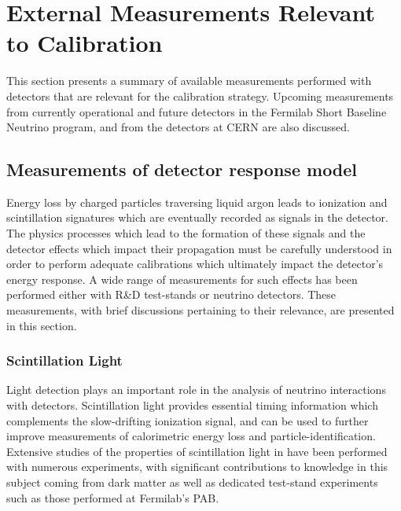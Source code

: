 \section{External Measurements Relevant to Calibration }\label{sec:extcalib}
This section presents a summary of available measurements performed with  detectors that are relevant for the  calibration strategy. Upcoming measurements from currently operational and future detectors in the Fermilab Short Baseline Neutrino program, and from the  detectors %
at CERN are also discussed. 

\subsection{Measurements of detector response model}
Energy loss by charged particles traversing liquid argon leads to ionization and scintillation signatures which are eventually recorded as signals in the detector. The physics processes which lead to the formation of these signals and the detector effects which impact their propagation must be carefully understood in order to perform adequate calibrations which ultimately impact the detector's energy response. A wide range of measurements for such effects has been performed either with R\&D test-stands or neutrino detectors. These measurements, with brief discussions pertaining to their relevance, are presented in this section.

\subsubsection{Scintillation Light}
Light detection plays an important role in the analysis of neutrino interactions with  detectors. Scintillation light provides essential timing information which complements the slow-drifting ionization signal, and can be used to further improve measurements of calorimetric energy loss and particle-identification. Extensive studies of the properties of scintillation light in  have been performed with numerous experiments, with significant contributions to knowledge in this subject coming from dark matter as well as dedicated test-stand experiments such as those performed at Fermilab's PAB. 

